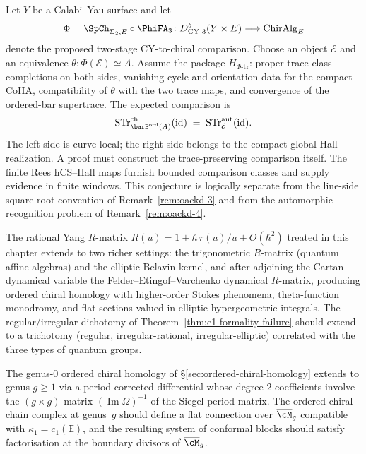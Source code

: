 \begin{conjecture}
\label{rem:oackd-6}
%
%
Let $Y$ be a Calabi--Yau surface and let
\[
\Phi=\SpCh_{\Sigma_2,E}\circ\PhiFA_3
\colon D^b_{\mathrm{CY}\text{-}3}(Y\times E)
\longrightarrow \mathrm{ChirAlg}_E
\]
denote the proposed two-stage CY-to-chiral comparison.  Choose an
object $\mathcal E$ and an equivalence
$\theta\colon\Phi(\mathcal E)\simeq A$.  Assume the package
$H_{\Phi\text{-}\mathrm{tr}}$: proper trace-class completions on both
sides, vanishing-cycle and orientation data for the compact CoHA,
compatibility of $\theta$ with the two trace maps, and convergence of
the ordered-bar supertrace.  The expected comparison is
\[
\operatorname{STr}^{\mathrm{ch}}_{\barB^{\mathrm{ord}}(A)}(\id)
\;=\;
\operatorname{STr}^{\mathrm{aut}}_{\mathcal E}(\id).
\]
The left side is curve-local; the right side belongs to the compact
global Hall realization.  A proof must construct the trace-preserving
comparison itself.  The finite Rees hCS--Hall maps furnish bounded
comparison classes and supply evidence in finite windows.  This
conjecture is logically separate from the line-side square-root
convention of Remark~\ref{rem:oackd-3} and from the automorphic
recognition problem of Remark~\ref{rem:oackd-4}.
\end{conjecture}

\begin{conjecture}
\label{conj:trig-elliptic-ordered}
\ClaimStatusConjectured
{}
The rational Yang $R$-matrix $R(u) = 1 + \hbar\,r(u)/u + O(\hbar^2)$
treated in this chapter extends to two richer settings:
the trigonometric $R$-matrix (quantum affine algebras) and the
elliptic Belavin kernel, and after adjoining the Cartan dynamical
variable the Felder--Etingof--Varchenko dynamical $R$-matrix, producing ordered chiral homology
with higher-order Stokes phenomena, theta-function monodromy, and
flat sections valued in elliptic hypergeometric integrals.
The regular/irregular dichotomy of
Theorem~\ref{thm:e1-formality-failure} should extend to a trichotomy
(regular, irregular-rational, irregular-elliptic) correlated with
the three types of quantum groups.
\end{conjecture}

\begin{conjecture}
\label{conj:higher-genus-ordered-ch}
\ClaimStatusConjectured
{}
The genus-$0$ ordered chiral homology of
\S\ref{sec:ordered-chiral-homology} extends to genus $g \ge 1$
via a period-corrected differential whose degree-$2$ coefficients
involve the $(g \times g)$-matrix $(\operatorname{Im}\Omega)^{-1}$
of the Siegel period matrix. The ordered chiral chain complex at
genus~$g$ should define a flat connection over
$\overline{\cM}_g$ compatible with
$\kappa_1 = c_1(\mathbb{E})$, and the resulting system of conformal
blocks should satisfy factorisation at the boundary divisors of
$\overline{\cM}_g$.
\end{conjecture}

